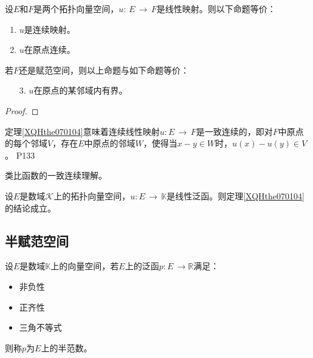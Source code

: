 \begin{theorem}\label{XQHthe070104}
	设$E$和$F$是两个拓扑向量空间，$u:\, E\, \rightarrow \, F $是线性映射。则以下命题等价：
	\begin{enumerate}
		\item $u$是连续映射。
		\item $u$在原点连续。
	\end{enumerate}
	若$F$还是赋范空间，则以上命题与如下命题等价：
	\begin{enumerate}
		\item[3.] $u$在原点的某邻域内有界。 
	\end{enumerate}
\end{theorem}

\begin{proof}
	
\end{proof}

\original
{定理\ref{XQHthe070104}意味着连续线性映射$u:E\, \rightarrow \, F $是一致连续的，即对$F$中原点的每个邻域$V$，存在$E$中原点的邻域$W$，使得当$x-y\in W $时，$u(x)-u(y) \in V $。
}
{P133}
\begin{remark}
	类比函数的一致连续理解。
\end{remark}

\begin{corollary}
	设$E$是数域$\mathcal{K}$上的拓扑向量空间，$u:E\, \rightarrow \, \mathbb{K} $是线性泛函。则定理\ref{XQHthe070104}的结论成立。
\end{corollary}


\subsection{半赋范空间}\label{XQH0702}

\begin{definition}
	设$E$是数域$\mathbb{K}$上的向量空间，若$E$上的泛函$p: E\, \rightarrow \mathbb{R} $满足：
	\begin{itemize}
		\item 非负性
		\item 正齐性
		\item 三角不等式
	\end{itemize}
	则称$p$为$E$上的半范数。
\end{definition}

